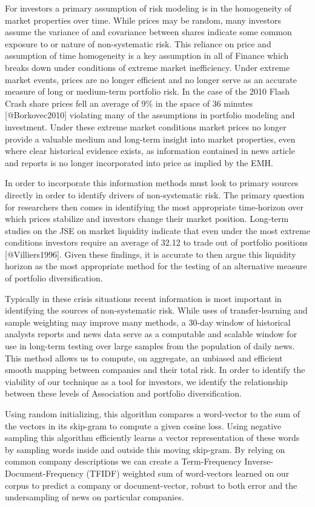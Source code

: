 \documentclass[11pt]{article}
\begin{document}
For investors a primary assumption of risk modeling is in the
homogeneity of market properties over time. While prices may be random,
many investors assume the variance of and covariance between shares
indicate some common exposure to or nature of non-systematic risk. This
reliance on price and assumption of time homogeneity is a key assumption
in all of Finance which breaks down under conditions of extreme market
inefficiency. Under extreme market events, prices are no longer
efficient and no longer serve as an accurate measure of long or
medium-term portfolio risk. In the case of the 2010 Flash Crash share
prices fell an average of 9\% in the space of 36 minutes
{[}@Borkovec2010{]} violating many of the assumptions in portfolio
modeling and investment. Under these extreme market conditions market
prices no longer provide a valuable medium and long-term insight into
market properties, even where clear historical evidence exists, as
information contained in news article and reports is no longer
incorporated into price as implied by the EMH.

In order to incorporate this information methods must look to primary
sources directly in order to identify drivers of non-systematic risk.
The primary question for researchers then comes in identifying the most
appropriate time-horizon over which prices stabilize and investors
change their market position. Long-term studies on the JSE on market
liquidity indicate that even under the most extreme conditions investors
require an average of 32.12 to trade out of portfolio positions
{[}@Villiers1996{]}. Given these findings, it is accurate to then argue
this liquidity horizon as the most appropriate method for the testing of
an alternative measure of portfolio diversification.

Typically in these crisis situations recent information is most
important in identifying the sources of non-systematic risk. While uses
of transfer-learning and sample weighting may improve many methods, a
30-day window of historical analysts reports and news data serve as a
computable and scalable window for use in long-term testing over large
samples from the population of daily news. This method allows us to
compute, on aggregate, an unbiased and efficient smooth mapping between
companies and their total risk. In order to identify the viability of
our technique as a tool for investors, we identify the relationship
between these levels of Association and portfolio diversification.

Using random initializing, this algorithm compares a word-vector to the
sum of the vectors in its skip-gram to compute a given cosine loss.
Using negative sampling this algorithm efficiently learns a vector
representation of these words by sampling words inside and outside this
moving skip-gram. By relying on common company descriptions we can
create a Term-Frequency Inverse-Document-Frequency (TFIDF) weighted sum
of word-vectors learned on our corpus to predict a company or
document-vector, robust to both error and the undersampling of news on
particular companies.
\end{document}
